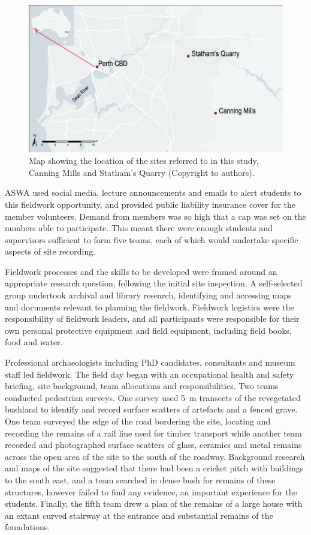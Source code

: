 \documentclass{ijsra}
\begin{document}
   	\begin{figure} %
   		\includegraphics[width=\linewidth]{figures/Fyfe-Figure01}
   		\caption{Map showing the location of the sites referred to in this study, Canning Mills and Statham’s Quarry (Copyright to authors).}
   		\centering
   		\label{fig:Fyfe-Figure01}
   	\end{figure}

ASWA used social media, lecture announcements and emails to alert students to this fieldwork opportunity, and provided public liability insurance cover for the member volunteers. 
Demand from members was so high that a cap was set on the numbers able to participate. 
This meant there were enough students and supervisors sufficient to form five teams, each of which would undertake specific aspects of site recording.

Fieldwork processes and the skills to be developed were framed around an appropriate research question, following the initial site inspection. A self-selected group undertook archival and library research, identifying and accessing maps and documents relevant to planning the fieldwork.
Fieldwork logistics were the responsibility of fieldwork leaders, and all participants were responsible for their own personal protective equipment and field equipment, including field books, food and water.

Professional archaeologists including PhD candidates, consultants and museum staff led fieldwork. 
The field day began with an occupational health and safety briefing, site background, team allocations and responsibilities. Two teams conducted pedestrian surveys. One survey used \SI{5}{\meter} transects of the revegetated bushland to identify and record surface scatters of artefacts and a fenced grave. 
One team surveyed the edge of the road bordering the site, locating and recording the remains of a rail line used for timber transport while another team recorded and photographed surface scatters of glass, ceramics and metal remains across the open area of the site to the south of the roadway. 
Background research and maps of the site suggested that there had been a cricket pitch with buildings to the south east, and a team searched in dense bush for remains of these structures, however failed to find any evidence, an important experience for the students. 
Finally, the fifth team drew a plan of the remains of a large house with an extant curved stairway at the entrance and substantial remains of the foundations.
\end{document}
